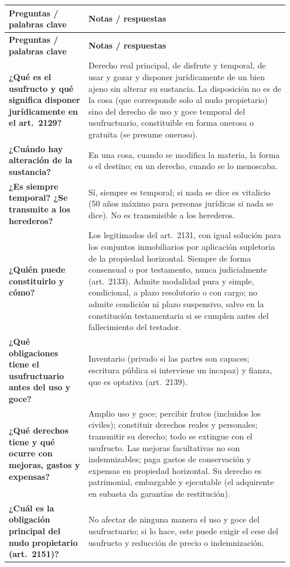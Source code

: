 \documentclass[12pt,oneside]{book}
\makeatletter
\newenvironment{cornell}{%
    \par\vspace{0.5em}
    \noindent
    \begin{longtable}{@{}>{\raggedright\arraybackslash}p{0.27\linewidth}
                         >{\raggedright\arraybackslash}p{0.68\linewidth}@{}}
    \toprule
    \textbf{Preguntas / palabras clave} & \textbf{Notas / respuestas} \\
    \midrule
    \endfirsthead
    \toprule
    \textbf{Preguntas / palabras clave} & \textbf{Notas / respuestas} \\
    \midrule
    \endhead
}{%
    \bottomrule
    \end{longtable}
}
\makeatother
\begin{document}
\begin{cornell}
\textbf{¿Qué es el usufructo y qué significa disponer jurídicamente en el art.~2129?} &
Derecho real principal, de disfrute y temporal, de usar y gozar y disponer jurídicamente de un bien ajeno sin alterar su sustancia. La disposición no es de la cosa (que corresponde solo al nudo propietario) sino del derecho de uso y goce temporal del usufructuario, constituible en forma onerosa o gratuita (se presume oneroso). \\

\textbf{¿Cuándo hay alteración de la sustancia?} &
En una cosa, cuando se modifica la materia, la forma o el destino; en un derecho, cuando se lo menoscaba. \\

\textbf{¿Es siempre temporal? ¿Se transmite a los herederos?} &
Sí, siempre es temporal; si nada se dice es vitalicio (50 años máximo para personas jurídicas si nada se dice). No es transmisible a los herederos. \\

\textbf{¿Quién puede constituirlo y cómo?} &
Los legitimados del art.~2131, con igual solución para los conjuntos inmobiliarios por aplicación supletoria de la propiedad horizontal. Siempre de forma consensual o por testamento, nunca judicialmente (art.~2133). Admite modalidad pura y simple, condicional, a plazo resolutorio o con cargo; no admite condición ni plazo suspensivo, salvo en la constitución testamentaria si se cumplen antes del fallecimiento del testador. \\

\textbf{¿Qué obligaciones tiene el usufructuario antes del uso y goce?} &
Inventario (privado si las partes son capaces; escritura pública si interviene un incapaz) y fianza, que es optativa (art.~2139). \\

\textbf{¿Qué derechos tiene y qué ocurre con mejoras, gastos y expensas?} &
Amplio uso y goce; percibir frutos (incluidos los civiles); constituir derechos reales y personales; transmitir su derecho; todo se extingue con el usufructo. Las mejoras facultativas no son indemnizables; paga gastos de conservación y expensas en propiedad horizontal. Su derecho es patrimonial, embargable y ejecutable (el adquirente en subasta da garantías de restitución). \\

\textbf{¿Cuál es la obligación principal del nudo propietario (art.~2151)?} &
No afectar de ninguna manera el uso y goce del usufructuario; si lo hace, este puede exigir el cese del usufructo y reducción de precio o indemnización. \\


\end{cornell}
\end{document}
